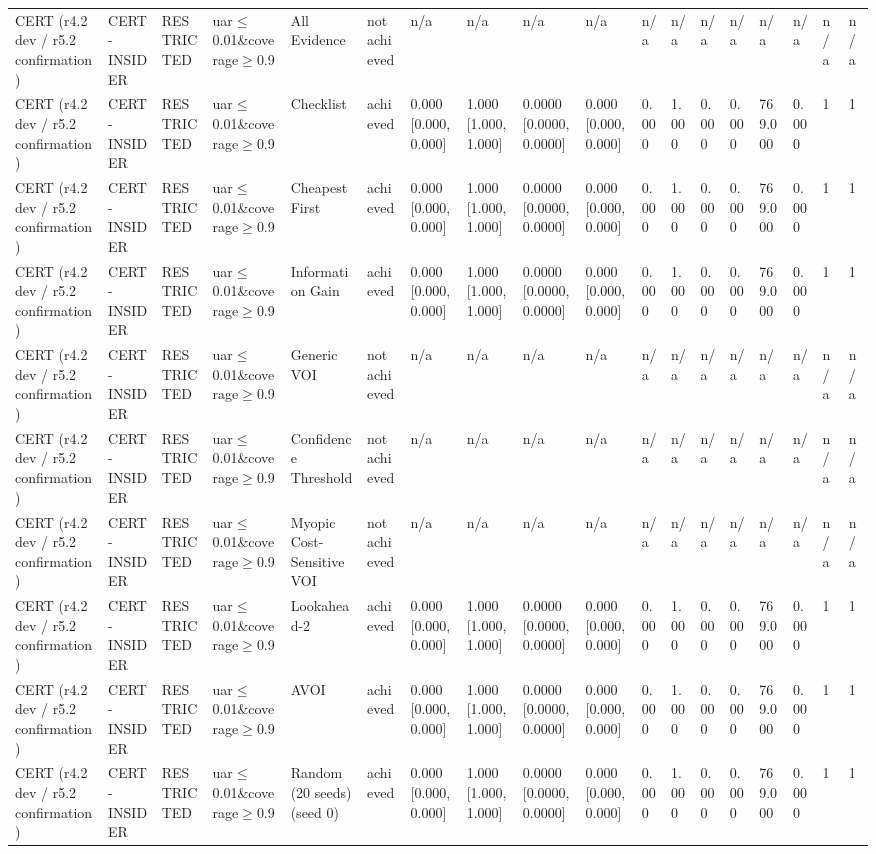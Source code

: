 \begin{table}[!ht]
{\begin{tabular}{llllllllllllllllll}
CERT (r4.2 dev / r5.2 confirmation) & CERT-INSIDER & RESTRICTED & uar$\le$0.01\&coverage$\ge$0.9 & All Evidence & not achieved & n/a & n/a & n/a & n/a & n/a & n/a & n/a & n/a & n/a & n/a & n/a & n/a \\
CERT (r4.2 dev / r5.2 confirmation) & CERT-INSIDER & RESTRICTED & uar$\le$0.01\&coverage$\ge$0.9 & Checklist & achieved & 0.000 [0.000, 0.000] & 1.000 [1.000, 1.000] & 0.0000 [0.0000, 0.0000] & 0.000 [0.000, 0.000] & 0.000 & 1.000 & 0.000 & 0.000 & 769.000 & 0.000 & 1 & 1 \\
CERT (r4.2 dev / r5.2 confirmation) & CERT-INSIDER & RESTRICTED & uar$\le$0.01\&coverage$\ge$0.9 & Cheapest First & achieved & 0.000 [0.000, 0.000] & 1.000 [1.000, 1.000] & 0.0000 [0.0000, 0.0000] & 0.000 [0.000, 0.000] & 0.000 & 1.000 & 0.000 & 0.000 & 769.000 & 0.000 & 1 & 1 \\
CERT (r4.2 dev / r5.2 confirmation) & CERT-INSIDER & RESTRICTED & uar$\le$0.01\&coverage$\ge$0.9 & Information Gain & achieved & 0.000 [0.000, 0.000] & 1.000 [1.000, 1.000] & 0.0000 [0.0000, 0.0000] & 0.000 [0.000, 0.000] & 0.000 & 1.000 & 0.000 & 0.000 & 769.000 & 0.000 & 1 & 1 \\
CERT (r4.2 dev / r5.2 confirmation) & CERT-INSIDER & RESTRICTED & uar$\le$0.01\&coverage$\ge$0.9 & Generic VOI & not achieved & n/a & n/a & n/a & n/a & n/a & n/a & n/a & n/a & n/a & n/a & n/a & n/a \\
CERT (r4.2 dev / r5.2 confirmation) & CERT-INSIDER & RESTRICTED & uar$\le$0.01\&coverage$\ge$0.9 & Confidence Threshold & not achieved & n/a & n/a & n/a & n/a & n/a & n/a & n/a & n/a & n/a & n/a & n/a & n/a \\
CERT (r4.2 dev / r5.2 confirmation) & CERT-INSIDER & RESTRICTED & uar$\le$0.01\&coverage$\ge$0.9 & Myopic Cost-Sensitive VOI & not achieved & n/a & n/a & n/a & n/a & n/a & n/a & n/a & n/a & n/a & n/a & n/a & n/a \\
CERT (r4.2 dev / r5.2 confirmation) & CERT-INSIDER & RESTRICTED & uar$\le$0.01\&coverage$\ge$0.9 & Lookahead-2 & achieved & 0.000 [0.000, 0.000] & 1.000 [1.000, 1.000] & 0.0000 [0.0000, 0.0000] & 0.000 [0.000, 0.000] & 0.000 & 1.000 & 0.000 & 0.000 & 769.000 & 0.000 & 1 & 1 \\
CERT (r4.2 dev / r5.2 confirmation) & CERT-INSIDER & RESTRICTED & uar$\le$0.01\&coverage$\ge$0.9 & AVOI & achieved & 0.000 [0.000, 0.000] & 1.000 [1.000, 1.000] & 0.0000 [0.0000, 0.0000] & 0.000 [0.000, 0.000] & 0.000 & 1.000 & 0.000 & 0.000 & 769.000 & 0.000 & 1 & 1 \\
CERT (r4.2 dev / r5.2 confirmation) & CERT-INSIDER & RESTRICTED & uar$\le$0.01\&coverage$\ge$0.9 & Random (20 seeds) (seed 0) & achieved & 0.000 [0.000, 0.000] & 1.000 [1.000, 1.000] & 0.0000 [0.0000, 0.0000] & 0.000 [0.000, 0.000] & 0.000 & 1.000 & 0.000 & 0.000 & 769.000 & 0.000 & 1 & 1 \\

\end{tabular}}
\end{table}
